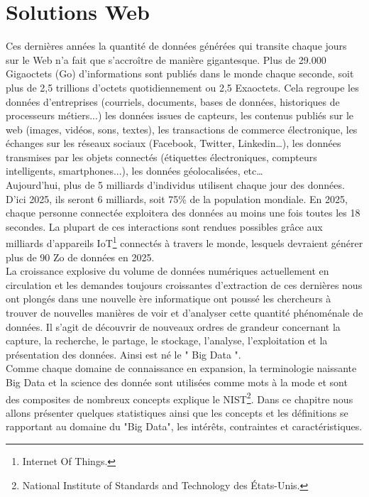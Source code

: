 \chapter{Solutions Web}

Ces dernières années la quantité de données générées qui transite chaque jours sur le Web n'a fait que s’accroître de manière gigantesque. Plus de 29.000 Gigaoctets (Go) d'informations sont publiés dans le monde chaque seconde, soit plus de 2,5 trillions d’octets quotidiennement ou 2,5 Exaoctets. Cela regroupe les données d'entreprises (courriels, documents, bases de données, historiques de processeurs métiers...) les données issues de capteurs, les contenus publiés sur le web (images, vidéos, sons, textes), les transactions de commerce électronique, les échanges sur les réseaux sociaux (Facebook, Twitter, Linkedin…), les données transmises par les objets connectés (étiquettes électroniques, compteurs intelligents, smartphones...), les données géolocalisées, etc… \\

Aujourd'hui, plus de 5 milliards d'individus utilisent chaque jour des données. D'ici 2025, ils seront 6 milliards, soit 75\% de la population mondiale. En 2025, chaque personne connectée exploitera des données au moins une fois toutes les 18 secondes. La plupart de ces interactions sont rendues possibles grâce aux milliards d'appareils IoT\footnote{Internet Of Things.} connectés à travers le monde, lesquels devraient générer plus de 90 Zo de données en 2025.\\

La croissance explosive du volume de données  numériques actuellement en circulation et les demandes toujours croissantes d'extraction de ces dernières nous ont plongés dans une nouvelle ère informatique ont poussé les chercheurs à trouver de nouvelles manières de voir et d’analyser cette quantité phénoménale de données. Il s'agit de découvrir de nouveaux ordres de grandeur concernant la capture, la recherche, le partage, le stockage, l’analyse, l’exploitation et la présentation des données. Ainsi est né le " Big Data ".\\

Comme chaque domaine de connaissance en expansion, la terminologie naissante Big Data et la science des donnée sont utilisées comme mots à la mode et sont des composites de nombreux concepts explique le NIST\footnote{National Institute of Standards and Technology des États-Unis.}. Dans ce chapitre nous allons présenter quelques statistiques ainsi que les concepts et les définitions se rapportant au domaine du "Big Data", les intérêts, contraintes et caractéristiques.\\
\newpage

